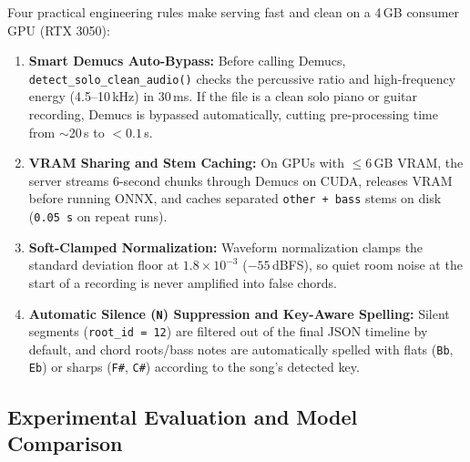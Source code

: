\documentclass[a4paper]{article}
\begin{document}
Four practical engineering rules make serving fast and clean on a 4\,GB consumer GPU (RTX 3050):
\begin{enumerate}
    \item \textbf{Smart Demucs Auto-Bypass:} Before calling Demucs, \texttt{detect\_solo\_clean\_audio()} checks the percussive ratio and high-frequency energy (4.5--10\,kHz) in 30\,ms. If the file is a clean solo piano or guitar recording, Demucs is bypassed automatically, cutting pre-processing time from $\sim$20\,s to $<0.1$\,s.
    \item \textbf{VRAM Sharing and Stem Caching:} On GPUs with $\le 6$\,GB VRAM, the server streams 6-second chunks through Demucs on CUDA, releases VRAM before running ONNX, and caches separated \texttt{other + bass} stems on disk (\texttt{0.05\,s} on repeat runs).
    \item \textbf{Soft-Clamped Normalization:} Waveform normalization clamps the standard deviation floor at $1.8 \times 10^{-3}$ ($-55$\,dBFS), so quiet room noise at the start of a recording is never amplified into false chords.
    \item \textbf{Automatic Silence (\texttt{N}) Suppression and Key-Aware Spelling:} Silent segments (\texttt{root\_id = 12}) are filtered out of the final JSON timeline by default, and chord roots/bass notes are automatically spelled with flats (\texttt{Bb}, \texttt{Eb}) or sharps (\texttt{F\#}, \texttt{C\#}) according to the song's detected key.
\end{enumerate}

\subsection{Experimental Evaluation and Model Comparison}
\end{document}
